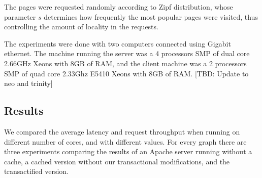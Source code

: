 \documentclass[preprint,natbib,11pt]{sigplanconf}
\begin{document}
The pages were requested randomly according to Zipf distribution, whose
parameter $s$ determines how frequently the most popular pages were visited,
thus controlling the amount of locality in the requests.

The experiments were done with two computers connected using Gigabit ethernet.
The machine running the server was a 4 processors SMP of dual core 2.66GHz Xeons
with 8GB of RAM, and the client machine was a 2 processors SMP of quad core
2.33Ghz E5410 Xeons with 8GB of RAM. [TBD: Update to neo and trinity]

\subsection{Results} 
We compared the average latency and request throughput when running on different
number of cores, and with different  values. For every graph there are three
experiments comparing the results of an Apache server running without a cache, a
cached version without our transactional modifications, and the transactified
version. 
\end{document}
